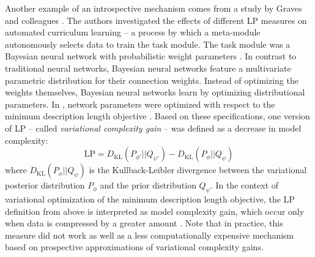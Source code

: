 Another example of an introspective mechanism comes from a study by Graves and colleagues \parencite{graves_automated_2017}. The authors investigated the effects of different \ac{LP} measures on automated curriculum learning -- a process by which a meta-module autonomously selects data to train the task module. The task module was a Bayesian neural network with probabilistic weight parameters \parencite{blundell_weight_2015}. In contrast to traditional neural networks, Bayesian neural networks feature a multivariate parametric distribution for their connection weights. Instead of optimizing the weights themselves, Bayesian neural networks learn by optimizing distributional parameters. In \parencite{graves_automated_2017}, network parameters were optimized with respect to the minimum description length objective \parencite[see][]{graves_practical_2011}. Based on these specifications, one version of \ac{LP} -- called \emph{variational complexity gain} -- was defined as a decrease in model complexity:
\begin{equation}
    \mathrm{LP} = D_{\mathrm{KL}}(P_{\phi'}||Q_{\psi'}) - D_{\mathrm{KL}}(P_{\phi}||Q_{\psi})
\end{equation}
where $D_{\mathrm{KL}}(P_{\phi}||Q_{\psi})$ is the Kullback-Leibler divergence between the variational posterior distribution $P_{\phi}$ and the prior distribution $Q_{\psi}$. In the context of variational optimization of the minimum description length objective, the \ac{LP} definition from above is interpreted as model complexity gain, which occur only when data is compressed by a greater amount \parencite{graves_automated_2017}. Note that in practice, this measure did not work as well as a less computationally expensive mechanism based on prospective approximations of variational complexity gains.

